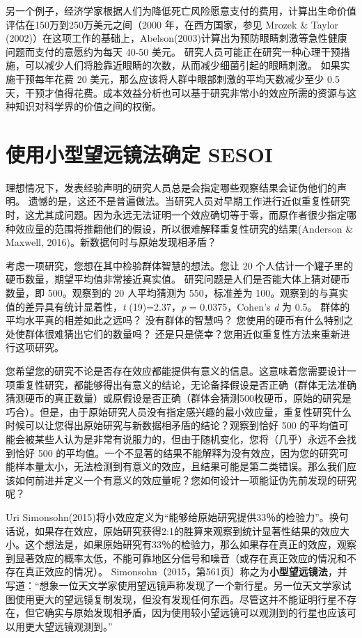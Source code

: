 \documentclass[
  letterpaper,
  DIV=11,
  numbers=noendperiod]{scrreprt}
\begin{document}
另一个例子，经济学家根据人们为降低死亡风险愿意支付的费用，计算出生命价值评估在150万到250万美元之间（2000
年，在西方国家，参见 Mrozek \& Taylor
(2002)）在这项工作的基础上，Abelson(2003)计算出为预防眼睛刺激等急性健康问题而支付的意愿约为每天
40-50 美元。
研究人员可能正在研究一种心理干预措施，可以减少人们将脸靠近眼睛的次数，从而减少细菌引起的眼睛刺激。
如果实施干预每年花费 20 美元，那么应该将人群中眼部刺激的平均天数减少至少
0.5
天，干预才值得花费。成本效益分析也可以基于研究非常小的效应所需的资源与这种知识对科学界的价值之间的权衡。

\hypertarget{ux4f7fux7528ux5c0fux578bux671bux8fdcux955cux6cd5ux786eux5b9a-sesoi}{%
\section{使用小型望远镜法确定
SESOI}\label{ux4f7fux7528ux5c0fux578bux671bux8fdcux955cux6cd5ux786eux5b9a-sesoi}}

理想情况下，发表经验声明的研究人员总是会指定哪些观察结果会证伪他们的声明。
遗憾的是，这还不是普遍做法。当研究人员对早期工作进行近似重复性研究时，这尤其成问题。因为永远无法证明一个效应确切等于零，而原作者很少指定哪种效应量的范围将推翻他们的假设，所以很难解释重复性研究的结果(Anderson
\& Maxwell, 2016)。新数据何时与原始发现相矛盾？

考虑一项研究，您想在其中检验群体智慧的想法。您让 20
个人估计一个罐子里的硬币数量，期望平均值非常接近真实值。
研究问题是人们是否能大体上猜对硬币数量，即 500。观察到的 20 人平均猜测为
550，标准差为 100。观察到的与真实值的差异具有统计显着性，\emph{t}
(19)=2.37，\emph{p} = 0.0375，Cohen's \emph{d} 为 0.5。
群体的平均水平真的相差如此之远吗？ 没有群体的智慧吗？
您使用的硬币有什么特别之处使群体很难猜出它们的数量吗？
还是只是侥幸？您用近似重复性方法来重新进行这项研究。

您希望您的研究不论是否存在效应都能提供有意义的信息。这意味着您需要设计一项重复性研究，都能够得出有意义的结论，无论备择假设是否正确（群体无法准确猜测硬币的真正数量）或原假设是否正确（群体会猜测500枚硬币，原始的研究是巧合）。但是，由于原始研究人员没有指定感兴趣的最小效应量，重复性研究什么时候可以让您得出原始研究与新数据相矛盾的结论？观察到恰好
500
的平均值可能会被某些人认为是非常有说服力的，但由于随机变化，您将（几乎）永远不会找到恰好
500
的平均值。一个不显著的结果不能解释为没有效应，因为您的研究可能样本量太小，无法检测到有意义的效应，且结果可能是第二类错误。那么我们应该如何前进并定义一个有意义的效应量呢？您如何设计一项能证伪先前发现的研究呢？

Uri
Simonsohn(2015)将小效应定义为``能够给原始研究提供33％的检验力''。换句话说，如果存在效应，原始研究获得2:1的胜算来观察到统计显著性结果的效应大小。这个想法是，如果原始研究有33％的检验力，那么如果存在真正的效应，观察到显著效应的概率太低，不能可靠地区分信号和噪音（或存在真正效应的情况和不存在真正效应的情况）。
Simonsohn（2015，第561页）称之为\textbf{小型望远镜法}，并写道：``想象一位天文学家使用望远镜声称发现了一个新行星。另一位天文学家试图使用更大的望远镜复制发现，但没有发现任何东西。尽管这并不能证明行星不存在，但它确实与原始发现相矛盾，因为使用较小望远镜可以观测到的行星也应该可以用更大望远镜观测到。''
\end{document}
